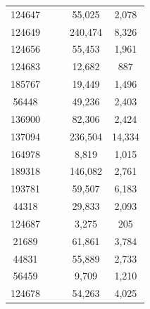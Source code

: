 \documentclass[conference]{IEEEtran}
\begin{document}
\begin{table}[]
\begin{center}
\begin{tabular}{ccccc}
                          124647 & & & 55,025 & 2,078 \\
                          124649 & & & 240,474 & 8,326 \\
                          124656 & & & 55,453 & 1,961 \\
                          124683 & & & 12,682 & 887 \\
                          185767 & & & 19,449 & 1,496 \\
                          56448 & & & 49,236 & 2,403 \\
                          136900 & & & 82,306 & 2,424 \\
                          137094 & & & 236,504 & 14,334 \\
                          164978 & & & 8,819 & 1,015 \\
                          189318 & & & 146,082 & 2,761 \\
                          193781 & & & 59,507 & 6,183 \\
                          44318 & & & 29,833 & 2,093 \\
                          124687 & & & 3,275 & 205 \\
                          21689 & & & 61,861 & 3,784 \\
                          44831 & & & 55,889 & 2,733 \\
                          56459 & & & 9,709 & 1,210 \\
                          124678 & & & 54,263 & 4,025 \\
  \hline
  \end{tabular}
  \label{tab.res_cost}
  \end{center}
\end{table}
\end{document}
